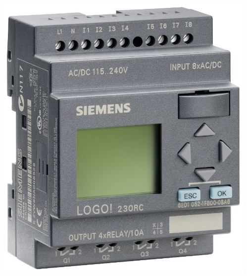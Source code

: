 \documentclass{beamer}
\begin{document}
\begin{frame}[fragile]{}
\begin{columns}[T]
\begin{column}{.49\textwidth}
\begin{tcolorbox}[adjusted title={\centering\large Industrial Systems}]
\begin{columns}
\begin{column}{.3\textwidth}
{                            \includegraphics{plc}
                        }
                    \end{column}
                    \begin{column}{.3\textwidth}
                        \centering
                    \end{column}

\end{columns}
\end{tcolorbox}
\end{column}
\end{columns}
\end{frame}
\end{document}
